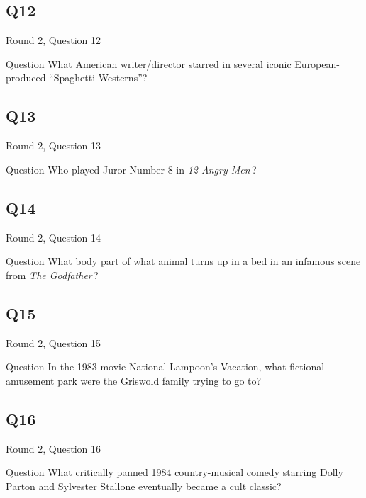 \documentclass[11pt]{beamer}
\begin{document}
\subsection*{Q12}
\begin{frame}[t]{Round 2, Question 12}
\vspace{2em}
\begin{block}{Question}
What American writer/director starred in several iconic European-produced ``Spaghetti Westerns''?
\end{block}
\end{frame}
    

\subsection*{Q13}
\begin{frame}[t]{Round 2, Question 13}
\vspace{2em}
\begin{block}{Question}
Who played Juror Number 8 in \emph{12 Angry Men}\,?
\end{block}
\end{frame}
    

\subsection*{Q14}
\begin{frame}[t]{Round 2, Question 14}
\vspace{2em}
\begin{block}{Question}
What body part of what animal turns up in a bed in an infamous scene from \emph{The Godfather}\,?
\end{block}
\end{frame}
    

\subsection*{Q15}
\begin{frame}[t]{Round 2, Question 15}
\vspace{2em}
\begin{block}{Question}
In the 1983 movie National Lampoon's Vacation, what fictional amusement park were the Griswold family trying to go to?
\end{block}
\end{frame}
    

\subsection*{Q16}
\begin{frame}[t]{Round 2, Question 16}
\vspace{2em}
\begin{block}{Question}
What critically panned 1984 country-musical comedy starring Dolly Parton and Sylvester Stallone eventually became a cult classic?
\end{block}
\end{frame}
    
\end{document}
